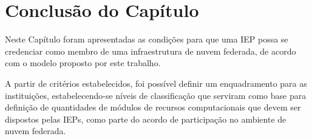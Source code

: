\documentclass[tese,capa]{texufpel}
\begin{document}
\section{Conclusão do Capítulo}\label{sec:concap}

Neste Capítulo foram apresentadas as condições para que uma IEP possa se credenciar como membro de uma infraestrutura de nuvem federada, de acordo com o modelo proposto por este trabalho.

A partir de critérios estabelecidos, foi possível definir um enquadramento para as instituições, estabelecendo-se níveis de classificação que serviram como base para definição de quantidades de módulos de recursos computacionais que devem ser dispostos pelas IEPs, como parte do acordo de participação no ambiente de nuvem federada.


\end{document}
